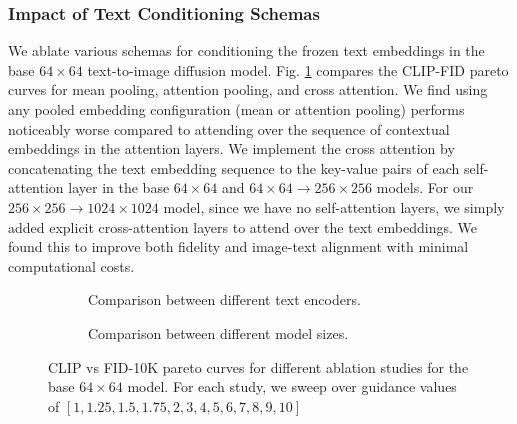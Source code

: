 \subsubsection{Impact of Text Conditioning Schemas}
\label{sec:text_conditioning_ablation}

We ablate various schemas for conditioning the frozen text embeddings in the base $64\times64$ text-to-image diffusion model. Fig. \ref{fig:text_cond_comparison} compares the CLIP-FID pareto curves for mean pooling, attention pooling, and cross attention. We find using any pooled embedding configuration (mean or attention pooling) performs noticeably worse compared to attending over the sequence of contextual embeddings in the attention layers. We implement the cross attention by concatenating the text embedding sequence to the key-value pairs of each self-attention layer in the base $64\times64$ and $64\times64 \rightarrow 256\times256$ models. %
For our $256\times256 \rightarrow 1024\times1024$ model, since we have no self-attention layers, we simply added explicit cross-attention layers to attend over the text embeddings. We found this to improve both fidelity and image-text alignment with minimal computational costs. 



\begin{figure}[t]
    \centering
    \begin{subfigure}[t]{0.49\textwidth}
    
    \caption{Comparison between different text encoders.}
     \label{fig:text_cond_comparison}
    \end{subfigure}
    \begin{subfigure}[t]{0.49\textwidth}
     \centering
     
      \caption{Comparison between different model sizes.}
      \label{fig:model_size_comparison}
    \end{subfigure}
    \caption{CLIP vs FID-10K pareto curves for different ablation studies for the base $64\times64$ model. For each study, we sweep over guidance values of $[1, 1.25, 1.5, 1.75, 2, 3, 4, 5, 6, 7, 8, 9, 10]$}
\end{figure}
